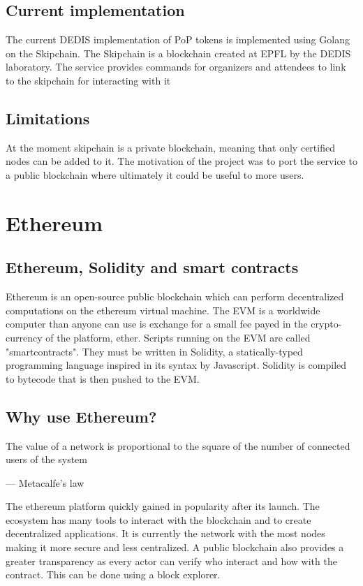 \documentclass[11pt, a4paper, twoside, openright]{book} %
\begin{document}
\subsection{Current implementation}
The current DEDIS implementation of PoP tokens is implemented using Golang on the Skipchain. The Skipchain is a blockchain created at EPFL by the DEDIS laboratory. The service provides commands for organizers and attendees to link to the skipchain for interacting with it

\subsection{Limitations}
At the moment skipchain is a private blockchain, meaning that only certified nodes can be added to it. The motivation of the project was to port the service to a public blockchain where ultimately it could be useful to more users.

\section{Ethereum}

\subsection{Ethereum, Solidity and smart contracts}
Ethereum is an open-source public blockchain which can perform decentralized computations on the ethereum virtual machine. The EVM is a worldwide computer than anyone can use is exchange for a small fee payed in the crypto-currency of the platform, ether. Scripts running on the EVM are called "smartcontracts". They must be written in Solidity, a statically-typed programming language inspired in its syntax by Javascript. Solidity is compiled to bytecode that is then pushed to the EVM.


\subsection{Why use Ethereum?}

\epigraph{The value of a network is proportional to the square of the number of connected users of the system}
{--- \textup{Metacalfe's law}}

The ethereum platform quickly gained in popularity after its launch. The ecosystem has many tools to interact with the blockchain and to create decentralized applications. It is currently the network with the most nodes making it more secure and less centralized. A public blockchain also provides a greater transparency as every actor can verify who interact and how with the contract. This can be done using a block explorer.
\end{document}
